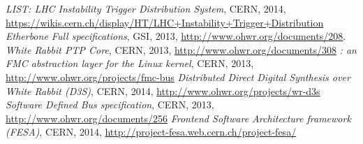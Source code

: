 \documentclass{article}
\begin{document}
\begin{thebibliography}{9}

  \emph{LIST: LHC Instability Trigger Distribution System},
  CERN, 2014,
  \url{https://wikis.cern.ch/display/HT/LHC+Instability+Trigger+Distribution}
  \emph{Etherbone Full specifications},
  GSI, 2013,
  \url{http://www.ohwr.org/documents/208}.
  \emph{White Rabbit PTP Core},
  CERN, 2013,
  \url{http://www.ohwr.org/documents/308}
  \emph{: an FMC abstraction layer for the Linux kernel},
  CERN, 2013,
  \url{http://www.ohwr.org/projects/fmc-bus}
  \emph{Distributed Direct Digital Synthesis over White Rabbit (D3S)},
  CERN, 2014,
  \url{http://www.ohwr.org/projects/wr-d3s}
  \emph{Software Defined Bus specification},
  CERN, 2013,
  \url{http://www.ohwr.org/documents/256}
  \emph{Frontend Software Architecture framework (FESA)},
  CERN, 2014,
  \url{http://project-fesa.web.cern.ch/project-fesa/}

\end{thebibliography}
\end{document}
